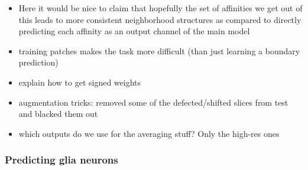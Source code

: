 \begin{itemize}
\item Here it would be nice to claim that hopefully the set of affinities we get out of this leads to more consistent neighborhood structures as compared to directly predicting each affinity as an output channel of the main model
\item training patches makes the task more difficult (than just learning a boundary prediction)
\item explain how to get signed weights
\item augmentation tricks: removed some of the defected/shifted slices from test and blacked them out
\item which outputs do we use for the averaging stuff? Only the high-res ones
\end{itemize}


\subsubsection{Predicting glia neurons}
